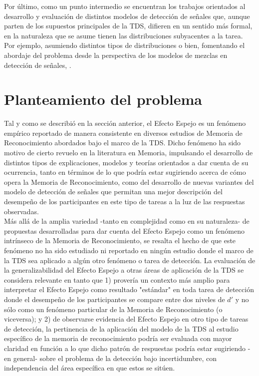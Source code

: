 Por último, como un punto intermedio se encuentran los trabajos orientados al desarrollo y evaluación de distintos modelos de detección de señales que, aunque parten de los supuestos principales de la TDS, difieren en un sentido más formal, en la naturaleza que se asume tienen las distribuciones subyacentes a la tarea. Por ejemplo, asumiendo distintos tipos de distribuciones \parencite{Glanzer1993, Glanzer2009} o bien, fomentando el abordaje del problema desde la perspectiva de los modelos de mezclas en detección de señales, \parencite{DeCarlo2002, DeCarlo2007}.\\

\section{Planteamiento del problema}

Tal y como se describió en la sección anterior, el Efecto Espejo es un fenómeno empírico reportado de manera consistente en diversos estudios de Memoria de Reconocimiento abordados bajo el marco de la TDS. Dicho fenómeno ha sido motivo de cierto revuelo en la literatura en Memoria, impulsando el desarrollo de distintos tipos de explicaciones, modelos y teorías orientados a dar cuenta de su ocurrencia, tanto en términos de lo que podría estar sugiriendo acerca de cómo opera la Memoria de Reconocimiento, como del desarrollo de nuevas variantes del modelo de detección de señales que permitan una mejor descripción del desempeño de los participantes en este tipo de tareas a la luz de las respuestas observadas.\\

Más allá de la amplia variedad -tanto en complejidad como en su naturaleza- de propuestas desarrolladas para dar cuenta del Efecto Espejo como un fenómeno intrínseco de la Memoria de Reconocimiento, se resalta el hecho de que este fenómeno no ha sido estudiado ni reportado en ningún estudio donde el marco de la TDS sea aplicado a algún otro fenómeno o tarea de detección. La evaluación de la generalizabilidad del Efecto Espejo a otras áreas de aplicación de la TDS se considera relevante en tanto que 1) provería un contexto más amplio para interpretar el Efecto Espejo como resultado "estándar" en toda tarea de detección donde el desempeño de los participantes se compare entre dos niveles de $d'$ y no sólo como un fenómeno particular de la Memoria de Reconocimiento (o viceversa); y 2) de observarse evidencia del Efecto Espejo en otro tipo de tareas de detección, la pertinencia de la aplicación del modelo de la TDS al estudio específico de la memoria de reconocimiento podría ser evaluada con mayor claridad en función a lo que dicho patrón de respuestas podría estar sugiriendo -en general- sobre el problema de la detección bajo incertidumbre, con independencia del área específica en que estos se sitúen.\\

